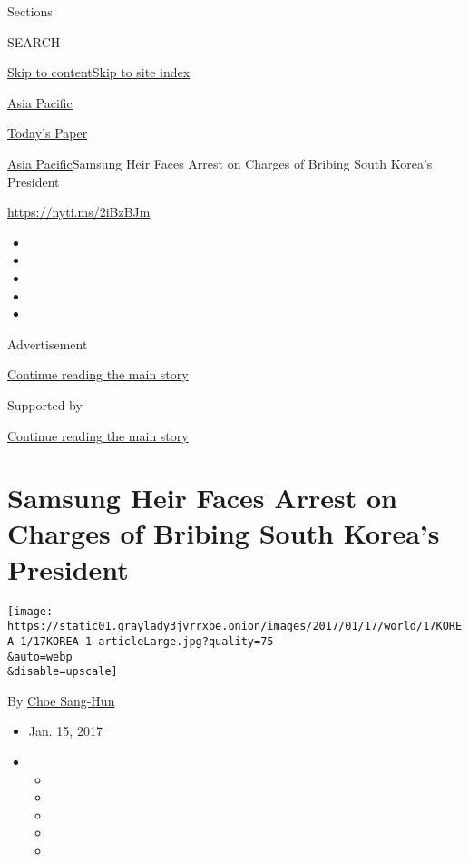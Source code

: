 Sections

SEARCH

\protect\hyperlink{site-content}{Skip to
content}\protect\hyperlink{site-index}{Skip to site index}

\href{https://www.nytimes3xbfgragh.onion/section/world/asia}{Asia
Pacific}

\href{https://myaccount.nytimes3xbfgragh.onion/auth/login?response_type=cookie\&client_id=vi}{}

\href{https://www.nytimes3xbfgragh.onion/section/todayspaper}{Today's
Paper}

\href{/section/world/asia}{Asia Pacific}\textbar{}Samsung Heir Faces
Arrest on Charges of Bribing South Korea's President

\url{https://nyti.ms/2iBzBJm}

\begin{itemize}
\item
\item
\item
\item
\item
\end{itemize}

Advertisement

\protect\hyperlink{after-top}{Continue reading the main story}

Supported by

\protect\hyperlink{after-sponsor}{Continue reading the main story}

\hypertarget{samsung-heir-faces-arrest-on-charges-of-bribing-south-koreas-president}{%
\section{Samsung Heir Faces Arrest on Charges of Bribing South Korea's
President}\label{samsung-heir-faces-arrest-on-charges-of-bribing-south-koreas-president}}

\texttt{[image: https://static01.graylady3jvrrxbe.onion/images/2017/01/17/world/17KOREA-1/17KOREA-1-articleLarge.jpg?quality=75\\\&auto=webp\\\&disable=upscale]}

By \href{http://www.nytimes3xbfgragh.onion/by/choe-sang-hun}{Choe
Sang-Hun}

\begin{itemize}
\item
  Jan. 15, 2017
\item
  \begin{itemize}
  \item
  \item
  \item
  \item
  \item
  \end{itemize}
\end{itemize}

